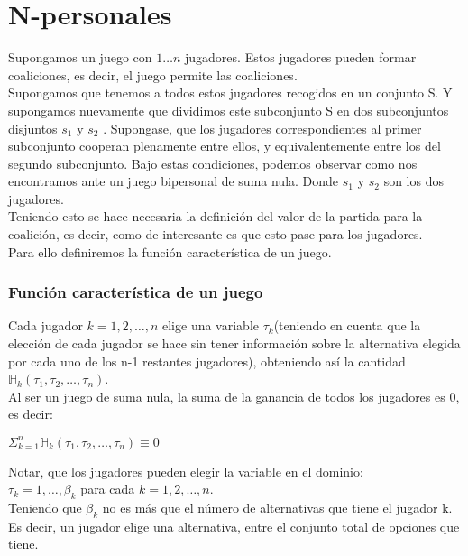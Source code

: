\documentclass[10pt,a4paper]{book}
\begin{document}
\section{N-personales}

Supongamos un juego con $1 \ldots n$ jugadores. Estos jugadores pueden formar coaliciones, es decir, el juego permite las coaliciones. \\
Supongamos que tenemos a todos estos jugadores recogidos en un conjunto S. Y supongamos nuevamente que dividimos este subconjunto S en dos subconjuntos disjuntos $s_1$ y $s_2$ . Supongase, que los jugadores correspondientes al primer subconjunto cooperan plenamente entre ellos, y equivalentemente entre los del segundo subconjunto. Bajo estas condiciones, podemos observar como nos encontramos ante un juego bipersonal de suma nula. Donde $s_1$ y $s_2$ son los dos jugadores.\\

Teniendo esto se hace necesaria la definición del valor de la partida para la coalición, es decir, como de interesante es que esto pase para los jugadores.\\ 
Para ello definiremos la función característica de un juego.\\

\subsubsection{Función característica de un juego}

Cada jugador $k=1,2, \ldots , n$ elige una variable $\tau_k$(teniendo en cuenta que la elección de cada jugador se hace sin tener información sobre la alternativa elegida por cada uno de los n-1 restantes jugadores), obteniendo así la cantidad $\mathbb{H}_k(\tau_1,\tau_2, \ldots, \tau_n)$.\\

Al ser un juego de suma nula, la suma de la ganancia de todos los jugadores es 0, es decir:
\begin{center}
$\Sigma^n_{k=1}\mathbb{H}_k(\tau_1,\tau_2, \ldots, \tau_n) \equiv 0 $
\end{center}

Notar, que los jugadores pueden elegir la variable en el dominio:\\

$\tau_k=1, \ldots, \beta_k$ para cada $k=1,2, \ldots ,n$.\\
Teniendo que $\beta_k$ no es más que el número de alternativas que tiene el jugador k. Es decir, un jugador elige una alternativa, entre el conjunto total de opciones que tiene.\\
\end{document}
